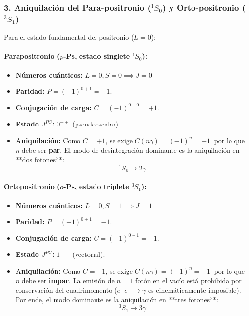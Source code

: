 \begin{problema}
\subsubsection*{3. Aniquilación del Para-positronio ($^1S_0$) y Orto-positronio ($^3S_1$)}

Para el estado fundamental del positronio ($L = 0$):

\paragraph{Parapositronio ($p$-Ps, estado singlete $^1S_0$):}
\begin{itemize}
    \item \textbf{Números cuánticos:} $L = 0, S = 0 \implies J = 0$.
    \item \textbf{Paridad:} $P = (-1)^{0+1} = -1$.
    \item \textbf{Conjugación de carga:} $C = (-1)^{0+0} = +1$.
    \item \textbf{Estado $J^{PC}$:} $0^{-+}$ (pseudoescalar).
    \item \textbf{Aniquilación:} Como $C = +1$, se exige $C(n\gamma) = (-1)^n = +1$, por lo que $n$ debe ser \textbf{par}. El modo de desintegración dominante es la aniquilación en **dos fotones**:
    \begin{equation*}
    ^1S_0 \longrightarrow 2\gamma
    \end{equation*}
\end{itemize}

\paragraph{Ortopositronio ($o$-Ps, estado triplete $^3S_1$):}
\begin{itemize}
    \item \textbf{Números cuánticos:} $L = 0, S = 1 \implies J = 1$.
    \item \textbf{Paridad:} $P = (-1)^{0+1} = -1$.
    \item \textbf{Conjugación de carga:} $C = (-1)^{0+1} = -1$.
    \item \textbf{Estado $J^{PC}$:} $1^{--}$ (vectorial).
    \item \textbf{Aniquilación:} Como $C = -1$, se exige $C(n\gamma) = (-1)^n = -1$, por lo que $n$ debe ser \textbf{impar}. La emisión de $n=1$ fotón en el vacío está prohibida por conservación del cuadrimomento ($e^+ e^- \to \gamma$ es cinemáticamente imposible). Por ende, el modo dominante es la aniquilación en **tres fotones**:
    \begin{equation*}
    ^3S_1 \longrightarrow 3\gamma
    \end{equation*}
\end{itemize}


\end{problema}
